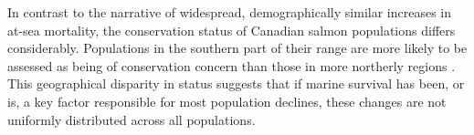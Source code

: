 \documentclass[12pt]{article}
\begin{document}


In contrast to the narrative of widespread, demographically similar increases
in at-sea mortality, the conservation status of Canadian salmon populations differs
considerably. Populations in the southern part of their range are more
likely to be assessed as being of conservation concern than those in more
northerly regions \citep{Cosewic2010}. This geographical disparity in status
suggests that if marine survival has been, or is, a key factor responsible for
most population declines, these changes are not uniformly distributed across
all populations. 


\end{document}
